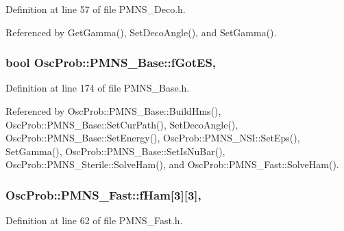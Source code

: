 Definition at line 57 of file P\+M\+N\+S\+\_\+\+Deco.\+h.



Referenced by Get\+Gamma(), Set\+Deco\+Angle(), and Set\+Gamma().

\subsubsection[{\texorpdfstring{f\+Got\+ES}{fGotES}}]{\setlength{\rightskip}{0pt plus 5cm}bool Osc\+Prob\+::\+P\+M\+N\+S\+\_\+\+Base\+::f\+Got\+ES\hspace{0.3cm}{\ttfamily [protected]}, {\ttfamily [inherited]}}\hypertarget{classOscProb_1_1PMNS__Base_a6dc5cd010d2d70b2324745b4e53e9839}{}\label{classOscProb_1_1PMNS__Base_a6dc5cd010d2d70b2324745b4e53e9839}


Definition at line 174 of file P\+M\+N\+S\+\_\+\+Base.\+h.



Referenced by Osc\+Prob\+::\+P\+M\+N\+S\+\_\+\+Base\+::\+Build\+Hms(), Osc\+Prob\+::\+P\+M\+N\+S\+\_\+\+Base\+::\+Set\+Cur\+Path(), Set\+Deco\+Angle(), Osc\+Prob\+::\+P\+M\+N\+S\+\_\+\+Base\+::\+Set\+Energy(), Osc\+Prob\+::\+P\+M\+N\+S\+\_\+\+N\+S\+I\+::\+Set\+Eps(), Set\+Gamma(), Osc\+Prob\+::\+P\+M\+N\+S\+\_\+\+Base\+::\+Set\+Is\+Nu\+Bar(), Osc\+Prob\+::\+P\+M\+N\+S\+\_\+\+Sterile\+::\+Solve\+Ham(), and Osc\+Prob\+::\+P\+M\+N\+S\+\_\+\+Fast\+::\+Solve\+Ham().

\subsubsection[{\texorpdfstring{f\+Ham}{fHam}}]{ Osc\+Prob\+::\+P\+M\+N\+S\+\_\+\+Fast\+::f\+Ham\mbox{[}3\mbox{]}\mbox{[}3\mbox{]}\hspace{0.3cm}{\ttfamily [protected]}, {\ttfamily [inherited]}}\hypertarget{classOscProb_1_1PMNS__Fast_aab37f2a7f59ab7026a8a21a561115dd0}{}\label{classOscProb_1_1PMNS__Fast_aab37f2a7f59ab7026a8a21a561115dd0}


Definition at line 62 of file P\+M\+N\+S\+\_\+\+Fast.\+h.



